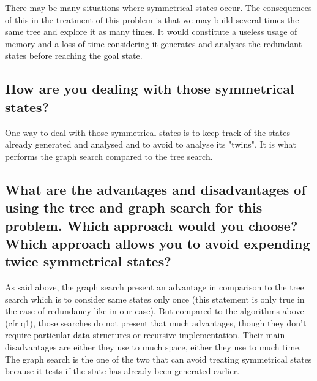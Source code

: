\documentclass[a4paper,10pt]{article}
\begin{document}
	There may be many situations where symmetrical states occur. The consequences of this in the treatment of this problem	is that we may build several times the same tree and explore it as many times. It would constitute a useless usage of memory and a loss of time considering it generates and analyses the redundant states before reaching the goal state.
	
	\subsection{How are you dealing with those symmetrical states?}
	
	One way to deal with those symmetrical states is to keep track of the states already generated and analysed and to avoid to analyse its "twins". It is what performs the graph search compared to the tree search.
	
	\subsection{What are the advantages and disadvantages of using the tree and graph search for this problem. Which approach would you choose? Which approach allows you to avoid expending twice symmetrical states?}

	As said above, the graph search present an advantage in comparison to the tree search which is to consider same states only once (this statement is only true in the case of redundancy like in our case). But compared to the algorithms above (cfr q1), those searches do not present that much advantages, though they don't require particular data structures or recursive implementation. Their main disadvantages are either they use to much space, either they use to much time.
	The graph search is the one of the two that can avoid treating symmetrical states because it tests if the state has already been generated earlier.
	
\end{document}

